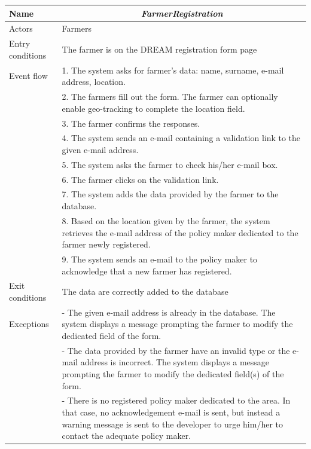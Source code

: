\begin{table}[htbp]
	\centering
	\begin{tabularx}{\linewidth}{|l|X|}
		\hline
		Name & \multicolumn{1}{c|}{\textit{\textbf{FarmerRegistration}}}                                                   \tabularnewline \hline
		Actors                                               & Farmers                                                    \tabularnewline \hline
		Entry conditions                                              & The farmer is on the DREAM registration form page                                                                                  \tabularnewline \hline
		Event flow                                         & 1.	The system asks for farmer’s data: name, surname, e-mail address, location.                                                                    \tabularnewline 
		& 2.	The farmers fill out the form. The farmer can optionally enable geo-tracking to complete the location field.                                                   \tabularnewline 
		& 3.	The farmer confirms the responses.                                                   \tabularnewline 
		& 4.	The system sends an e-mail containing a validation link to the given e-mail address.                                                \tabularnewline
		& 5.	The system asks the farmer to check his/her e-mail box.                                               \tabularnewline
		& 6.	The farmer clicks on the validation link.                                     \tabularnewline
		& 7.	The system adds the data provided by the farmer to the database.                                  \tabularnewline
		& 8.	Based on the location given by the farmer, the system retrieves the e-mail address of the policy maker dedicated to the farmer newly registered.                               \tabularnewline
		& 9.	The system sends an e-mail to the policy maker to acknowledge that a new farmer has registered.                              \tabularnewline \hline
		Exit conditions & The data are correctly added to the database
		\tabularnewline \hline
		Exceptions & 
		-	The given e-mail address is already in the database. The system displays a message prompting the farmer to modify the dedicated field of the form.  \tabularnewline
		
		&-	The data provided by the farmer have an invalid type or the e-mail address is incorrect. The system displays a message prompting the farmer to modify the dedicated field(s) of the form. 
		\tabularnewline
		&-	There is no registered policy maker dedicated to the area. In that case, no acknowledgement e-mail is sent, but instead a warning message is sent to the developer to urge him/her to contact the adequate policy maker. 
		\tabularnewline
		\hline
	\end{tabularx}   
\end{table}

